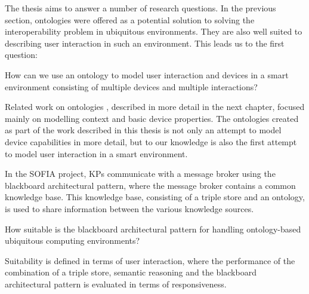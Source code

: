 

The thesis aims to answer a number of research questions. In the previous section, ontologies were offered as a potential solution to solving the interoperability problem in ubiquitous environments. They are also well suited to describing user interaction in such an environment. This leads us to the first question:

\begin{question}
How can we use an ontology to model user interaction and devices in a smart environment consisting of multiple devices and multiple interactions? 
\end{question}

Related work on ontologies \cite{Chen2004,Ranganathan2004,Ngo2004}, described in more detail in the next chapter, focused mainly on modelling context and basic device properties. The ontologies created as part of the work described in this thesis is not only an attempt to model device capabilities in more detail, but to our knowledge is also the first attempt to model user interaction in a smart environment. 


\label{blackboard}
In the \ac{SOFIA} project, \acp{KP} communicate with a message broker using the blackboard architectural pattern, where the message broker contains a common knowledge base. This knowledge base, consisting of a triple store and an ontology, is used to share information between the various knowledge sources.

\begin{question}
How suitable is the blackboard architectural pattern for handling ontology-based ubiquitous computing environments? 
\end{question}

Suitability is defined in terms of user interaction, where the performance of the combination of a triple store, semantic reasoning and the blackboard architectural pattern is evaluated in terms of responsiveness.

